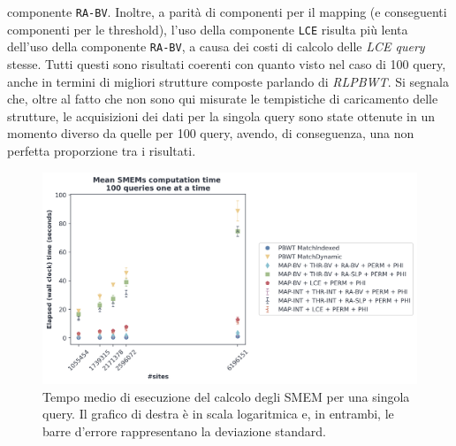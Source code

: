 componente \texttt{RA-BV}. Inoltre, a parità di componenti per il mapping (e
conseguenti componenti per le threshold), l'uso della componente \texttt{LCE}
risulta più lenta dell'uso della componente \texttt{RA-BV}, a causa dei costi di
calcolo delle \textit{LCE query} stesse. Tutti questi sono risultati coerenti
con quanto visto nel caso di 100 query, anche in termini di migliori strutture
composte parlando di \textit{RLPBWT}. Si segnala che, oltre al fatto che non
sono qui misurate le tempistiche di caricamento delle strutture, le acquisizioni
dei dati 
per la singola query sono state ottenute in un momento diverso da quelle per 100
query, avendo, di conseguenza, una non perfetta proporzione tra i risultati.
\begin{figure}
  \centering
  \includegraphics[width=\textwidth]{img/exe_time_single_paper.png}
  \caption{Tempo medio di esecuzione del calcolo degli SMEM per una singola
    query. Il grafico di destra è in scala logaritmica e, in entrambi, le
    barre d'errore rappresentano la deviazione standard.}
  \label{fig:smemsinglechr}
\end{figure}

